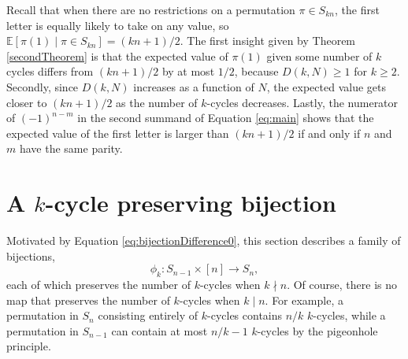 Recall that when there are no restrictions on a permutation $\pi \in S_{kn}$, the
first letter is equally likely to take on any value,
so $\mathbb{E}[\pi(1) \mid \pi \in S_{kn}] = (kn+1)/2$.
The first insight given by Theorem \ref{secondTheorem}
is that the expected value of $\pi(1)$ given some
number of $k$ cycles differs from $(kn+1)/2$ by at most $1/2$,
because $D(k,N) \geq 1$ for $k \geq 2$.
%
Secondly, since $D(k, N)$ increases as a function of $N$, the expected value
gets closer to $(kn+1)/2$ as the number of $k$-cycles decreases.
%
Lastly, the numerator of $(-1)^{n-m}$ in the second summand of
Equation \ref{eq:main} shows that the expected value of the first letter is
larger than $(kn+1)/2$ if and only if $n$ and $m$ have the same parity.

\section{A \texorpdfstring{$k$}{k}-cycle preserving bijection}
\label{section:bijection}
Motivated by Equation \ref{eq:bijectionDifference0}, this section describes a
family of bijections,
  \[\phi_k \colon S_{n-1} \times [n] \rightarrow S_n,\]
each of which preserves the number of $k$-cycles when $k \nmid n$.
Of course, there is no map that preserves the number of $k$-cycles when $k \mid n$. For example, a permutation in
$S_n$ consisting entirely of $k$-cycles contains $n/k$ $k$-cycles, while a permutation
in $S_{n-1}$ can contain at most $n/k - 1$ $k$-cycles by the pigeonhole principle.



